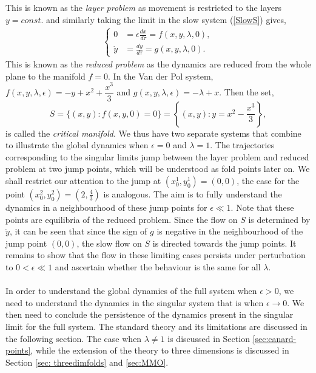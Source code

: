 This is known as the \emph{layer problem} as movement is restricted to the layers $y=const.$ and similarly taking the limit in the slow system (\ref{SlowS}) gives,
	\begin{align}\label{SlowS0}
		\begin{cases}
			0 &= \epsilon \frac{dx}{d \tau} = f(x,y,\lambda, 0),\\
			\dot{y} & = \frac{dy}{d \tau} =  g( x,y, \lambda,0).
		\end{cases}
	\end{align}
This is known as the \emph{reduced problem} as the dynamics are reduced from the whole plane to the manifold $f=0$. In the Van der Pol system, $f(x,y,\lambda,\epsilon)=-y+x^2+\dfrac{x^3}{3}$ and $g(x,y,\lambda,\epsilon)=-\lambda+x$. Then the set,
\begin{equation}
 S= \{ (x,y) : f(x,y,0)=0 \} = \left\{ (x,y) : y = x^2-\dfrac{x^3}{3}\right \},\label{CriticalS}
\end{equation} 
is called the \emph{critical manifold}. We thus have two separate systems that combine to illustrate the global dynamics when $\epsilon =0$ and $\lambda = 1$. 
The trajectories corresponding to the singular limits jump between the layer problem and reduced problem at two jump points, which will be understood as fold points later on. We shall restrict our attention to the jump at $ (x^1_0,y^1_0)=(0,0)$, the case for the point $(x^2_0,y^2_0)=(2,\frac{4}{3})$ is analogous. The aim is to fully understand the dynamics in a neighbourhood of these jump points for $\epsilon \ll 1$. Note that these points are equilibria of the reduced problem. Since the flow on $S$ is determined by $\dot{y}$, it can be seen that since the sign of $g$ is negative in the neighbourhood of the jump point $(0,0)$, the slow flow on $S$ is directed towards the jump points. It remains to show that the flow in these limiting cases persists under perturbation to $0<\epsilon \ll 1$ and ascertain whether the behaviour is the same for all $\lambda$.  
\\
\\
In order to understand the global dynamics of the full system when $\epsilon >0$, we need to understand the dynamics in the singular system that is when $\epsilon \to 0$. We then need to conclude the persistence of the dynamics present in the singular limit for the full system. The standard theory and its limitations are discussed in the following section. The case when $\lambda \neq 1$ is discussed in Section \ref{sec:canard-points}, while the extension of the theory to three dimensions is discussed in Section \ref{sec: threedimfolds} and \ref{sec:MMO}.


